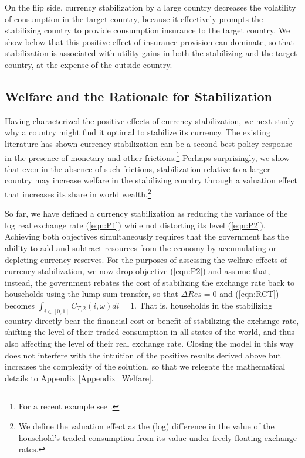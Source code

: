 \documentclass[12pt,letter]{article}
\theoremstyle{break} \theorembodyfont{\normalfont\itshape}
\theoremstyle{break}
\theoremstyle{break} \theorembodyfont{\normalfont\itshape}
\theoremstyle{break} \theorembodyfont{\normalfont\itshape}
\begin{document}
On the flip side, currency stabilization by a large country decreases
the volatility of consumption in the target country, because it
effectively prompts the stabilizing country to provide consumption
insurance to the target country. We show below that this positive
effect of insurance provision can dominate, so that stabilization is
associated with utility gains in both the stabilizing and the target
country, at the expense of the outside country.



\subsection{Welfare and the Rationale for
  Stabilization \label{sec_welfare}}



Having characterized the positive effects of currency stabilization,
we next study why a country might find it optimal to stabilize its
currency. The existing literature has shown currency stabilization can
be a second-best policy response in the presence of monetary and other
frictions.\footnote{For a recent example see \cite{Fanelli2019}.}
Perhaps surprisingly, we show that even in the absence of such
frictions, stabilization relative to a larger country may increase
welfare in the stabilizing country through a valuation effect that
increases its share in world wealth.\footnote{We define the valuation
  effect as the (log) difference in the value of the household's
  traded consumption from its value under freely floating exchange
  rates.}


So far, we have defined a currency stabilization as reducing the
variance of the log real exchange rate (\ref{eqn:P1}) while not
distorting its level (\ref{eqn:P2}). Achieving both objectives
simultaneously requires that the government has the ability to add and
subtract resources from the economy by accumulating or depleting
currency reserves. For the purposes of assessing the welfare effects
of currency stabilization, we now drop objective (\ref{eqn:P2}) and
assume that, instead, the government rebates the cost of stabilizing
the exchange rate back to households using the lump-sum transfer, so
that \(\Delta Res=0\) and (\ref{eqn:RCT}) becomes
$ \int_{i \in [0, 1]} C_{T, 2}(i, \omega) di =1 . $ That is,
households in the stabilizing country directly bear the financial cost
or benefit of stabilizing the exchange rate, shifting the level of
their traded consumption in all states of the world, and thus also
affecting the level of their real exchange rate. Closing the model in
this way does not interfere with the intuition of the positive results
derived above but increases the complexity of the solution, so that we
relegate the mathematical details to Appendix \ref{Appendix_Welfare}.
\end{document}
